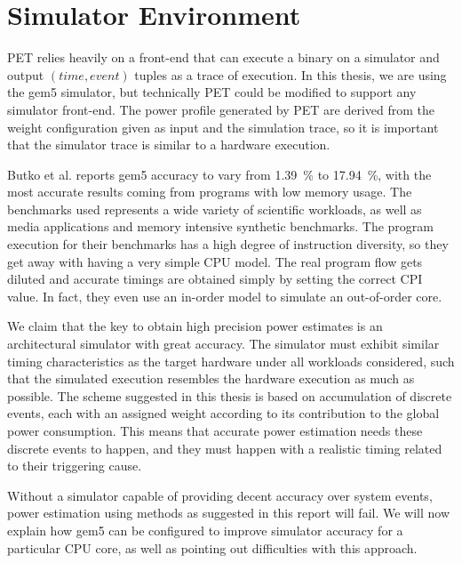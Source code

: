 \section{Simulator Environment}

PET relies heavily on a front-end that can execute a binary on a simulator and
output $(time, event)$ tuples as a trace of execution. In this thesis, we are
using the gem5 simulator, but technically PET could be modified to support any
simulator front-end. The power profile generated by PET are derived from the
weight configuration given as input and the simulation trace, so it is important
that the simulator trace is similar to a hardware execution.

Butko et al. \cite{butko2012accuracy} reports gem5 accuracy to vary from 1.39~\%
to 17.94~\%, with the most accurate results coming from programs with low memory
usage. The benchmarks used represents a wide variety of scientific workloads, as
well as media applications and memory intensive synthetic benchmarks. The
program execution for their benchmarks has a high degree of instruction
diversity, so they get away with having a very simple CPU model. The real
program flow gets diluted and accurate timings are obtained simply by setting
the correct CPI value. In fact, they even use an in-order model to simulate an
out-of-order core.

We claim that the key to obtain high precision power estimates is an
architectural simulator with great accuracy. The simulator must exhibit similar
timing characteristics as the target hardware under all workloads considered,
such that the simulated execution resembles the hardware execution as much as
possible. The scheme suggested in this thesis is based on accumulation of
discrete events, each with an assigned weight according to its contribution to
the global power consumption. This means that accurate power estimation needs
these discrete events to happen, and they must happen with a realistic timing
related to their triggering cause.

Without a simulator capable of providing decent accuracy over system events,
power estimation using methods as suggested in this report will fail. We will
now explain how gem5 can be configured to improve simulator accuracy for a
particular CPU core, as well as pointing out difficulties with this approach.


